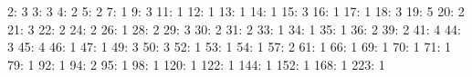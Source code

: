 2: 3
3: 3
4: 2
5: 2
7: 1
9: 3
11: 1
12: 1
13: 1
14: 1
15: 3
16: 1
17: 1
18: 3
19: 5
20: 2
21: 3
22: 2
24: 2
26: 1
28: 2
29: 3
30: 2
31: 2
33: 1
34: 1
35: 1
36: 2
39: 2
41: 4
44: 3
45: 4
46: 1
47: 1
49: 3
50: 3
52: 1
53: 1
54: 1
57: 2
61: 1
66: 1
69: 1
70: 1
71: 1
79: 1
92: 1
94: 2
95: 1
98: 1
120: 1
122: 1
144: 1
152: 1
168: 1
223: 1
